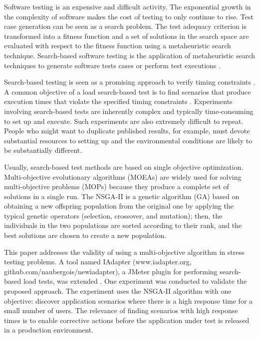 \documentclass{report}
\begin{document}
Software testing is an expensive and difficult activity. The exponential
growth in the complexity of software makes the cost of testing to only continue to rise. Test case generation can be seen as a search problem. The test adequacy criterion is transformed into a fitness function and a set of solutions in the search
space are evaluated with respect to the fitness function using a metaheuristic search technique. Search-based software testing is the application of metaheuristic search techniques to generate software
tests cases or perform test executions \cite{Afzal2009a} \cite{Gay}.


Search-based testing is seen as a promising approach to verify timing constraints \cite{Afzal2009a}. A common objective of a load search-based test is to find  scenarios that produce execution times that violate the specified timing constraints \cite{Sullivan}. Experiments involving search-based tests are inherently complex and typically time-consuming to set up and
execute. Such experiments are also extremely difficult to
repeat. People who might want to duplicate published results, for example, must devote substantial resources to setting up and the environmental conditions are likely to be substantially different. 

Usually,   search-based test methods are based on single objective optimization. Multi-objective evolutionary algorithms (MOEAs) are widely used for solving multi-objective problems (MOPs) because they produce a complete set of solutions in a single run. The NSGA-II  is a genetic algorithm (GA) based on obtaining a new offspring population from the original one by applying the typical genetic operators (selection, crossover, and mutation);
then, the individuals in the two populations are sorted according to their rank, and the best solutions are chosen to create a new population.  

This paper addresses the validity of using a multi-objective algorithm in stress testing problems. A tool named IAdapter (www.iadapter.org, github.com/naubergois/newiadapter), a JMeter plugin for performing search-based load tests, was extended \cite{Gois2016}.  One experiment was conducted to validate the proposed approach. The experiment uses the NSGA-II algorithm with one objective: discover application scenarios where there is a high response time for a small number of users. The relevance of finding scenarios with high response times is to enable corrective actions before the application under test is released in a production environment.
\end{document}

